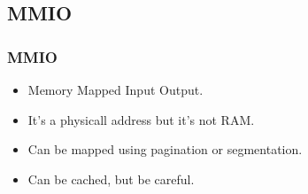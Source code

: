 \begin{frame}
\begin{center}
\begin{overlayarea}{10cm}{10cm}
\end{overlayarea}
\end{center}
\end{frame}

\subsection{MMIO}
\begin{frame}
        \frametitle{MMIO}
        \begin{itemize}
        \item Memory Mapped Input Output.
        \item It's a physicall address but it's not RAM.
        \item Can be mapped using pagination or segmentation.
        \item Can be cached, but be careful.
        \end{itemize}
\end{frame}

